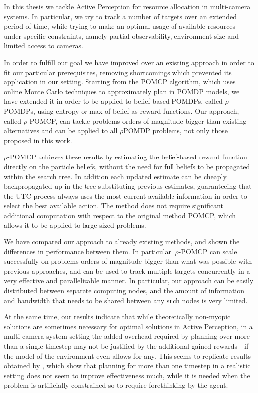 In this thesis we tackle Active Perception for resource allocation in multi-camera systems. In
particular, we try to track a number of targets over an extended period of time, while trying to make an
optimal usage of available resources under specific constraints, namely partial
observability, environment size and limited access to cameras.

In order to fulfill our goal we have improved over an existing approach in order to fit our particular
prerequisites, removing shortcomings which prevented its application in our setting. Starting from the POMCP algorithm, which uses online Monte Carlo techniques to
approximately plan in POMDP models, we have extended it in order to be applied to belief-based
POMDPs, called $\rho$POMDPs, using entropy or max-of-belief as reward functions. Our approach,
called $\rho$-POMCP, can tackle problems orders of magnitude bigger than existing alternatives and
can be applied to all $\rho$POMDP problems, not only those proposed in this work.

$\rho$-POMCP achieves these results by estimating the belief-based reward function directly on the particle beliefs, without the need for full beliefs to be propagated within the search tree. In addition each updated estimate can be cheaply backpropagated up in the tree substituting previous estimates, guaranteeing that the UTC process always uses the most current available information in order to select the best available action. The method does not require significant additional computation with respect to the original method POMCP, which allows it to be applied to large sized problems.

We have compared our approach to already existing methods, and shown the differences in performance
between them. In particular, $\rho$-POMCP can scale successfully on problems orders of magnitude
bigger than what was possible with previous approaches, and can be used to track multiple targets
concurrently in a very effective and parallelizable manner. In particular, our approach can be
easily distributed between separate computing nodes, and the amount of information and bandwidth
that needs to be shared between any such nodes is very limited.

At the same time, our results indicate that while theoretically non-myopic solutions are sometimes
necessary for optimal solutions in Active Perception, in a multi-camera system setting the added
overhead required by planning over more than a single timestep may not be justified by the
additional gained rewards - if the model of the environment even allows for any. This seems to
replicate results obtained by \cite{cit:relworktanks}, which show that planning for more than one timestep in a realistic
setting does not seem to improve effectiveness much, while it is needed when the problem is
artificially constrained so to require forethinking by the agent.

